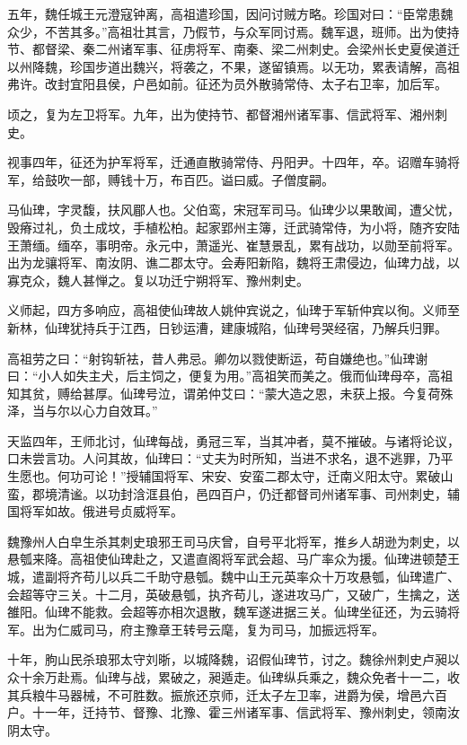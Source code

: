 \documentclass[12pt,UTF8]{ctexbook}
\begin{document}
五年，魏任城王元澄寇钟离，高祖遣珍国，因问讨贼方略。珍国对曰：“臣常患魏众少，不苦其多。”高祖壮其言，乃假节，与众军同讨焉。魏军退，班师。出为使持节、都督梁、秦二州诸军事、征虏将军、南秦、梁二州刺史。会梁州长史夏侯道迁以州降魏，珍国步道出魏兴，将袭之，不果，遂留镇焉。以无功，累表请解，高祖弗许。改封宜阳县侯，户邑如前。征还为员外散骑常侍、太子右卫率，加后军。

顷之，复为左卫将军。九年，出为使持节、都督湘州诸军事、信武将军、湘州刺史。

视事四年，征还为护军将军，迁通直散骑常侍、丹阳尹。十四年，卒。诏赠车骑将军，给鼓吹一部，赙钱十万，布百匹。谥曰威。子僧度嗣。

马仙琕，字灵馥，扶风郿人也。父伯鸾，宋冠军司马。仙琕少以果敢闻，遭父忧，毁瘠过礼，负土成坟，手植松柏。起家郢州主簿，迁武骑常侍，为小将，随齐安陆王萧缅。缅卒，事明帝。永元中，萧遥光、崔慧景乱，累有战功，以勋至前将军。出为龙骧将军、南汝阴、谯二郡太守。会寿阳新陷，魏将王肃侵边，仙琕力战，以寡克众，魏人甚惮之。复以功迁宁朔将军、豫州刺史。

义师起，四方多响应，高祖使仙琕故人姚仲宾说之，仙琕于军斩仲宾以徇。义师至新林，仙琕犹持兵于江西，日钞运漕，建康城陷，仙琕号哭经宿，乃解兵归罪。

高祖劳之曰：“射钩斩袪，昔人弗忌。卿勿以戮使断运，苟自嫌绝也。”仙琕谢曰：“小人如失主犬，后主饲之，便复为用。”高祖笑而美之。俄而仙琕母卒，高祖知其贫，赙给甚厚。仙琕号泣，谓弟仲艾曰：“蒙大造之恩，未获上报。今复荷殊泽，当与尔以心力自效耳。”

天监四年，王师北讨，仙琕每战，勇冠三军，当其冲者，莫不摧破。与诸将论议，口未尝言功。人问其故，仙琕曰：“丈夫为时所知，当进不求名，退不逃罪，乃平生愿也。何功可论！”授辅国将军、宋安、安蛮二郡太守，迁南义阳太守。累破山蛮，郡境清谧。以功封浛洭县伯，邑四百户，仍迁都督司州诸军事、司州刺史，辅国将军如故。俄进号贞威将军。

魏豫州人白皁生杀其刺史琅邪王司马庆曾，自号平北将军，推乡人胡逊为刺史，以悬瓠来降。高祖使仙琕赴之，又遣直阁将军武会超、马广率众为援。仙琕进顿楚王城，遣副将齐苟儿以兵二千助守悬瓠。魏中山王元英率众十万攻悬瓠，仙琕遣广、会超等守三关。十二月，英破悬瓠，执齐苟儿，遂进攻马广，又破广，生擒之，送雒阳。仙琕不能救。会超等亦相次退散，魏军遂进据三关。仙琕坐征还，为云骑将军。出为仁威司马，府主豫章王转号云麾，复为司马，加振远将军。

十年，朐山民杀琅邪太守刘晣，以城降魏，诏假仙琕节，讨之。魏徐州刺史卢昶以众十余万赴焉。仙琕与战，累破之，昶遁走。仙琕纵兵乘之，魏众免者十一二，收其兵粮牛马器械，不可胜数。振旅还京师，迁太子左卫率，进爵为侯，增邑六百户。十一年，迁持节、督豫、北豫、霍三州诸军事、信武将军、豫州刺史，领南汝阴太守。
\end{document}
